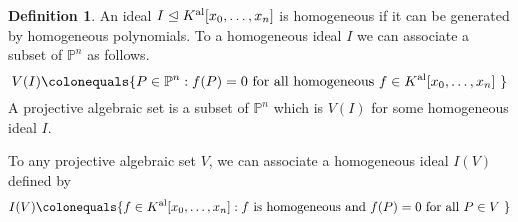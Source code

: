 \documentclass{dcthesis}
\newcommand{\PP}{\mathbb P}
\newcommand{\CC}{\mathbb C}
\newcommand{\defi}[1]{\textsf{#1}}
\newcommand{\mm}[1]{{\color{blue} \sf MM: [#1]}}
\newcommand{\Kal}{{{K}^{\textup{al}}}}
\numberwithin{equation}{section}
\newtheorem{theorem}[equation]{Theorem}
\theoremstyle{definition}
\newtheorem{definition}[equation]{Definition}
\theoremstyle{remark}
\begin{document}
{{\begin{definition}
      An ideal $I\trianglelefteq\Kal[x_0,\dots,x_n]$
      is \defi{homogeneous}
      if it can be generated by homogeneous polynomials.
      To a homogeneous ideal $I$ we can associate a subset of
      $\PP^n$ as follows.
      \[
        V(I)\colonequals
        \{P\in\PP^n : f(P)=0\text{ for all homogeneous $f\in\Kal[x_0,\dots,x_n]$ }\}
      \]
      A \defi{projective algebraic set}
      is a subset of $\PP^n$ which is $V(I)$
      for some homogeneous ideal $I$.
    \end{definition}
    To any projective algebraic set $V$,
    we can associate a homogeneous ideal $I(V)$ defined by
    \begin{equation}
      \label{eqn:projectivealgebraicsetideal}
      I(V)
      \colonequals
      \{f\in\Kal[x_0,\dots,x_n]:f \text{ is homogeneous and }f(P) = 0\text{ for all $P\in V$ }\}
    \end{equation}
  }
}
\end{document}
